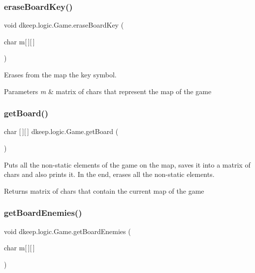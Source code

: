 \subsubsection{\texorpdfstring{erase\+Board\+Key()}{eraseBoardKey()}}
{\footnotesize\ttfamily void dkeep.\+logic.\+Game.\+erase\+Board\+Key (\begin{DoxyParamCaption}\item[{char}]{m\mbox{[}$\,$\mbox{]}\mbox{[}$\,$\mbox{]} }\end{DoxyParamCaption})}

Erases from the map the key symbol. 
\begin{DoxyParams}{Parameters}
{\em m} & matrix of chars that represent the map of the game \\
\hline
\end{DoxyParams}
\mbox{\label{classdkeep_1_1logic_1_1_game_a00104638b06a79e0b90768a1df2628c2}} 
\subsubsection{\texorpdfstring{get\+Board()}{getBoard()}}
{\footnotesize\ttfamily char \mbox{[}$\,$\mbox{]}\mbox{[}$\,$\mbox{]} dkeep.\+logic.\+Game.\+get\+Board (\begin{DoxyParamCaption}{ }\end{DoxyParamCaption})}

Puts all the non-\/static elements of the game on the map, saves it into a matrix of chars and also prints it. In the end, erases all the non-\/static elements. \begin{DoxyReturn}{Returns}
matrix of chars that contain the current map of the game 
\end{DoxyReturn}
\mbox{\label{classdkeep_1_1logic_1_1_game_a891c0dd84b0a828714135cf2e56258e8}} 
\subsubsection{\texorpdfstring{get\+Board\+Enemies()}{getBoardEnemies()}}
{\footnotesize\ttfamily void dkeep.\+logic.\+Game.\+get\+Board\+Enemies (\begin{DoxyParamCaption}\item[{char}]{m\mbox{[}$\,$\mbox{]}\mbox{[}$\,$\mbox{]} }\end{DoxyParamCaption})}

